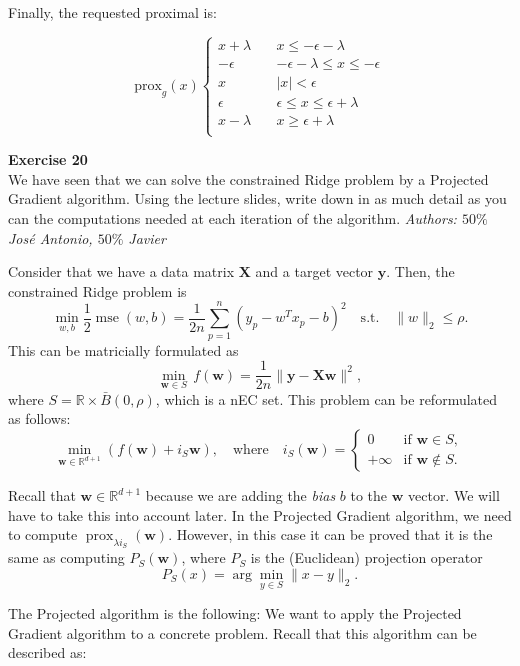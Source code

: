 \documentclass[11pt,table]{article}
\newenvironment{problem}[2][Exercise]
{ \begin{mdframed}[backgroundcolor=gray!20] \textbf{#1 #2} \\}
	{\hspace{0.0cm}\newline\newline \emph{Authors: \(50\%\) José Antonio, \(50\%\) Javier}  \end{mdframed}}
\newcommand\R{\mathbb R}
\begin{document}
	Finally, the requested proximal is:
	
	\[
	\text{prox}_g(x) \begin{cases}
		x + \lambda \quad & x \le -\epsilon-\lambda               \\
		-\epsilon \quad   & -\epsilon-\lambda \le x \le -\epsilon \\
		x \quad           & |x| < \epsilon                        \\
		\epsilon \quad    & \epsilon \le x \le \epsilon+\lambda   \\
		x-\lambda \quad   & x \ge \epsilon+\lambda                \\
	\end{cases}
	\]
	
	\begin{problem}{20}
		We have seen that we can solve the constrained Ridge problem by a Projected Gradient algorithm. Using the lecture slides, write down in as much detail as you can the computations needed at each iteration of the algorithm.
	\end{problem}
	
	Consider that we have a data matrix \(\mathbf{X}\) and a target vector \(\mathbf{y}\). Then, the constrained Ridge problem is
	\[
	\min_{w,b}\frac{1}{2} \operatorname{mse}(w,b)= \frac{1}{2n}\sum_{p=1}^n (y_p-w^Tx_p-b)^2 \quad \text{s.t.} \quad \|w\|_2\leq \rho.
	\]
	This can be matricially formulated as
	\[
	\min_{\mathbf{w}\in S} \, f(\mathbf{ w})=\frac{1}{2n}\|\mathbf{y} - \mathbf{Xw}\|^2,
	\]
	where $S=\mathbb R \times \bar B(0, \rho)$, which is a nEC set. This problem can be reformulated as follows:
	\[
	\min_{\mathbf{w} \in \mathbb R^{d+1}} \left(f(\mathbf{w}) + i_S\mathbf{w}\right), \quad \text{where} \quad i_S(\mathbf{w})=\begin{cases}0 & \text{if } \mathbf{w}\in S,\\ +\infty & \text{if } \mathbf{w} \notin S.\end{cases}
	\]
	
	Recall that \(\mathbf{w}\in \R^{d+1}\) because we are adding the \emph{bias} \(b\) to the \(\mathbf{w}\) vector. We will have to take this into account later. In the Projected Gradient algorithm, we need to compute  $\operatorname{prox}_{\lambda i_S}(\mathbf{w})$. However, in this case it can be proved that it is the same as computing $P_S(\mathbf{w})$, where $P_S$ is the (Euclidean) projection operator
	\[
	P_S(x)=\arg\min_{y\in S} \|x-y\|_2.
	\]
	
	The Projected algorithm is the following:
	We want to apply the Projected Gradient algorithm to a concrete problem. Recall that this algorithm can be described as:
	
\end{document}
